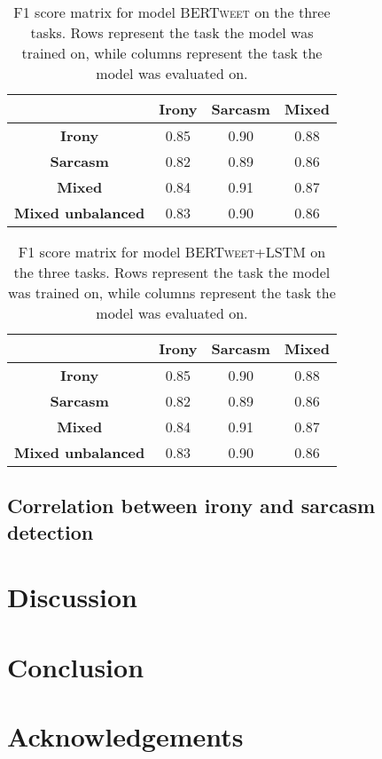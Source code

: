 \documentclass[10pt, a4paper]{article}
\begin{document}
\begin{table}[h!]
   \centering
   \begin{tabular}{|c|c|c|c|}
       \hline
        & \textbf{Irony} & \textbf{Sarcasm} & \textbf{Mixed} \\ \hline
       \textbf{Irony} & 0.85 & 0.90 & 0.88 \\ \hline
       \textbf{Sarcasm} & 0.82 & 0.89 & 0.86 \\ \hline
       \textbf{Mixed} & 0.84 & 0.91 & 0.87 \\ \hline
       \textbf{Mixed unbalanced} & 0.83 & 0.90 & 0.86\\ \hline
   \end{tabular}
   \caption{F1 score matrix for model \textsc{BERTweet} on the three tasks. Rows represent the task the model was trained on, 
   while columns represent the task the model was evaluated on.}
   \label{tab:bertweet-results}
\end{table}

\begin{table}[h!]
   \centering
   \begin{tabular}{|c|c|c|c|}
       \hline
       & \textbf{Irony} & \textbf{Sarcasm} & \textbf{Mixed} \\ \hline
       \textbf{Irony} & 0.85 & 0.90 & 0.88 \\ \hline
       \textbf{Sarcasm} & 0.82 & 0.89 & 0.86 \\ \hline
       \textbf{Mixed} & 0.84 & 0.91 & 0.87 \\ \hline
       \textbf{Mixed unbalanced} & 0.83 & 0.90 & 0.86\\ \hline
   \end{tabular}
   \caption{F1 score matrix for model \textsc{BERTweet+LSTM} on the three tasks. Rows represent the task the model was trained on, 
   while columns represent the task the model was evaluated on.}
   \label{tab:bertweet-bilstm-results}
\end{table}

\subsection{Correlation between irony and sarcasm detection}\label{correlation}

\section{Discussion}

\section{Conclusion}

\section*{Acknowledgements}


 
\end{document}
